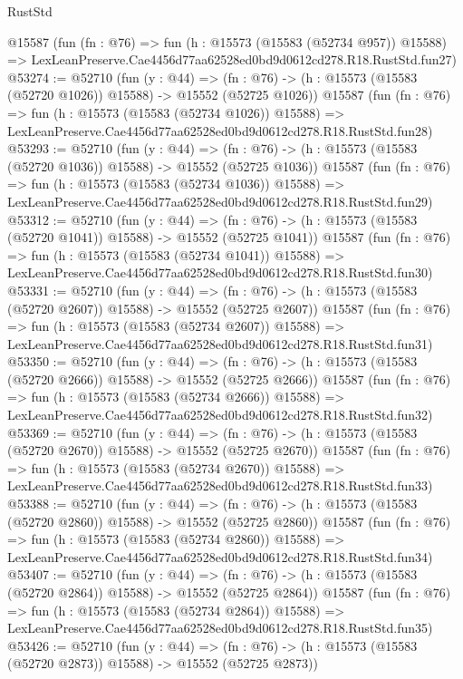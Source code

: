 \begin{lexlean}{RustStd}
\begin{coremodule}
    @15587
    (fun (fn : @76) =>
    fun (h : @15573 (@15583 (@52734 @957)) @15588) =>
    LexLeanPreserve.Cae4456d77aa62528ed0bd9d0612cd278.R18.RustStd.fun27)
@53274 := @52710
    (fun (y : @44) =>
    (fn : @76) -> (h : @15573 (@15583 (@52720 @1026)) @15588) -> @15552 (@52725 @1026))
    @15587
    (fun (fn : @76) =>
    fun (h : @15573 (@15583 (@52734 @1026)) @15588) =>
    LexLeanPreserve.Cae4456d77aa62528ed0bd9d0612cd278.R18.RustStd.fun28)
@53293 := @52710
    (fun (y : @44) =>
    (fn : @76) -> (h : @15573 (@15583 (@52720 @1036)) @15588) -> @15552 (@52725 @1036))
    @15587
    (fun (fn : @76) =>
    fun (h : @15573 (@15583 (@52734 @1036)) @15588) =>
    LexLeanPreserve.Cae4456d77aa62528ed0bd9d0612cd278.R18.RustStd.fun29)
@53312 := @52710
    (fun (y : @44) =>
    (fn : @76) -> (h : @15573 (@15583 (@52720 @1041)) @15588) -> @15552 (@52725 @1041))
    @15587
    (fun (fn : @76) =>
    fun (h : @15573 (@15583 (@52734 @1041)) @15588) =>
    LexLeanPreserve.Cae4456d77aa62528ed0bd9d0612cd278.R18.RustStd.fun30)
@53331 := @52710
    (fun (y : @44) =>
    (fn : @76) -> (h : @15573 (@15583 (@52720 @2607)) @15588) -> @15552 (@52725 @2607))
    @15587
    (fun (fn : @76) =>
    fun (h : @15573 (@15583 (@52734 @2607)) @15588) =>
    LexLeanPreserve.Cae4456d77aa62528ed0bd9d0612cd278.R18.RustStd.fun31)
@53350 := @52710
    (fun (y : @44) =>
    (fn : @76) -> (h : @15573 (@15583 (@52720 @2666)) @15588) -> @15552 (@52725 @2666))
    @15587
    (fun (fn : @76) =>
    fun (h : @15573 (@15583 (@52734 @2666)) @15588) =>
    LexLeanPreserve.Cae4456d77aa62528ed0bd9d0612cd278.R18.RustStd.fun32)
@53369 := @52710
    (fun (y : @44) =>
    (fn : @76) -> (h : @15573 (@15583 (@52720 @2670)) @15588) -> @15552 (@52725 @2670))
    @15587
    (fun (fn : @76) =>
    fun (h : @15573 (@15583 (@52734 @2670)) @15588) =>
    LexLeanPreserve.Cae4456d77aa62528ed0bd9d0612cd278.R18.RustStd.fun33)
@53388 := @52710
    (fun (y : @44) =>
    (fn : @76) -> (h : @15573 (@15583 (@52720 @2860)) @15588) -> @15552 (@52725 @2860))
    @15587
    (fun (fn : @76) =>
    fun (h : @15573 (@15583 (@52734 @2860)) @15588) =>
    LexLeanPreserve.Cae4456d77aa62528ed0bd9d0612cd278.R18.RustStd.fun34)
@53407 := @52710
    (fun (y : @44) =>
    (fn : @76) -> (h : @15573 (@15583 (@52720 @2864)) @15588) -> @15552 (@52725 @2864))
    @15587
    (fun (fn : @76) =>
    fun (h : @15573 (@15583 (@52734 @2864)) @15588) =>
    LexLeanPreserve.Cae4456d77aa62528ed0bd9d0612cd278.R18.RustStd.fun35)
@53426 := @52710
    (fun (y : @44) =>
    (fn : @76) -> (h : @15573 (@15583 (@52720 @2873)) @15588) -> @15552 (@52725 @2873))

\end{coremodule}
\end{lexlean}

